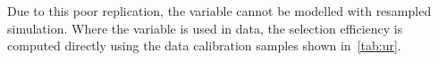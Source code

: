 Due to this poor replication,  the \dllpk variable cannot be modelled with resampled simulation. Where the variable is used in data, the selection efficiency is computed directly using the data calibration samples shown in~\autoref{tab:ur}.




  




\FloatBarrier
